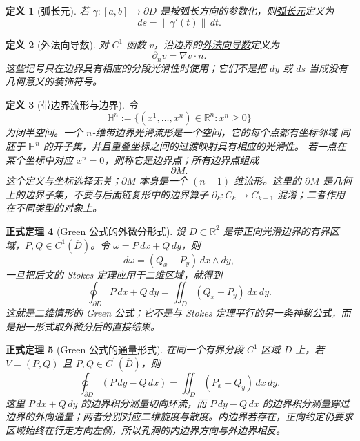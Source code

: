 \documentclass[UTF8,fontset=none,a4paper,11pt]{ctexart}
\theoremstyle{foundation-definition}
\newtheorem{definition}{定义}[section]
\theoremstyle{foundation-theorem}
\newtheorem{theorem}[definition]{正式定理}
\theoremstyle{foundation-proposition}
\theoremstyle{foundation-example}
\theoremstyle{foundation-remark}
\theoremstyle{foundation-theorem}
\newcommand{\term}[2]{\hyperref[#1]{#2}}
\begin{document}
\begin{definition}[弧长元]\label{def:arclength-element}
若 \(\gamma:[a,b]\to\partial D\) 是按弧长方向的参数化，则\term{def:arclength-element}{弧长元}定义为
\[
ds=\|\gamma'(t)\|\,dt.
\]
\end{definition}

\begin{definition}[外法向导数]\label{def:normal-derivative}
对 \(C^1\) 函数 \(v\)，沿边界的\term{def:normal-derivative}{外法向导数}定义为
\[
\partial_nv=\nabla v\cdot n.
\]
这些记号只在边界具有相应的分段光滑性时使用；它们不是把 \(dy\) 或 \(ds\) 当成没有几何意义的装饰符号。
\end{definition}

\begin{definition}[带边界流形与边界]\label{def:manifold-with-boundary}
令
\[
\mathbb H^n:=\{(x^1,\ldots,x^n)\in\mathbb R^n:x^n\ge0\}
\]
为闭半空间。一个 \(n\)-维带边界光滑流形是一个空间，它的每个点都有坐标邻域
同胚于 \(\mathbb H^n\) 的开子集，并且重叠坐标之间的过渡映射具有相应的光滑性。
若一点在某个坐标中对应 \(x^n=0\)，则称它是边界点；所有边界点组成
\[
\partial M.
\]
这个定义与坐标选择无关；\(\partial M\) 本身是一个 \((n-1)\)-维流形。这里的
\(\partial M\) 是几何上的边界子集，不要与后面链复形中的边界算子
\(\partial_k:C_k\to C_{k-1}\) 混淆；二者作用在不同类型的对象上。
\end{definition}

\begin{theorem}[Green 公式的外微分形式]\label{thm:green-circulation}
设 \(D\subset\mathbb R^2\) 是带正向光滑边界的有界区域，\(P,Q\in C^1(\overline D)\)。令 \(\omega=P\,dx+Q\,dy\)，则
\[
d\omega=(Q_x-P_y)\,dx\wedge dy,
\]
一旦把后文的 Stokes 定理应用于二维区域，就得到
\[
\oint_{\partial D}P\,dx+Q\,dy
=\iint_D(Q_x-P_y)\,dx\,dy.
\]
这就是二维情形的 Green 公式；它不是与 Stokes 定理平行的另一条神秘公式，而是把一形式取外微分后的直接结果。
\end{theorem}

\begin{theorem}[Green 公式的通量形式]\label{thm:green-flux}
在同一个有界分段 \(C^1\) 区域 \(D\) 上，若 \(V=(P,Q)\) 且 \(P,Q\in C^1(\overline D)\)，则
\[
\oint_{\partial D}(P\,dy-Q\,dx)
=\iint_D(P_x+Q_y)\,dx\,dy.
\]
这里 \(P\,dx+Q\,dy\) 的边界积分测量切向环流，而 \(P\,dy-Q\,dx\) 的边界积分测量穿过边界的外向通量；两者分别对应二维旋度与散度。内边界若存在，正向约定仍要求区域始终在行走方向左侧，所以孔洞的内边界方向与外边界相反。
\end{theorem}
\end{document}
